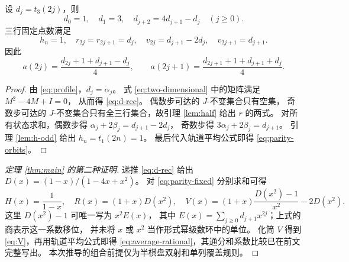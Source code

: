 \begin{proposition}\label{prop:parity}
设 $d_j=t_3(2j)$，则
\begin{equation}\label{eq:d-rec}
 d_0=1,\quad d_1=3,\quad d_{j+2}=4d_{j+1}-d_j\quad(j\ge0).
\end{equation}
三行固定点数满足
\begin{equation}\label{eq:parity-fixed}
 h_n=1,\quad r_{2j}=r_{2j+1}=d_j,\quad
 v_{2j}=d_{j+1}-2d_j,\quad v_{2j+1}=d_{j+1}.
\end{equation}
因此
\begin{equation}\label{eq:parity-orbits}
 a(2j)=\frac{d_{2j}+1+d_{j+1}-d_j}{4},\qquad
 a(2j+1)=\frac{d_{2j+1}+1+d_{j+1}+d_j}{4}.
\end{equation}
\end{proposition}
\begin{proof}
由 \eqref{eq:profile}，$d_j=\alpha_j$。
式 \eqref{eq:two-dimensional} 中的矩阵满足 $M^2-4M+I=0$，
从而得 \eqref{eq:d-rec}。
偶数步可达的 $J$-不变集合只有空集，
奇数步可达的 $J$-不变集合只有全三行集合，故引理 \ref{lem:half} 给出 $r$ 的两式。
对所有状态求和，偶数步得
$\alpha_j+2\beta_j=d_{j+1}-2d_j$，
奇数步得 $3\alpha_j+2\beta_j=d_{j+1}$。
引理 \ref{lem:h-odd} 给出 $h_n=t_1(2n)=1$。
最后代入轨道平均公式即得 \eqref{eq:parity-orbits}。
\end{proof}

\begin{proof}[定理 \ref{thm:main} 的第二种证明]
递推 \eqref{eq:d-rec} 给出 $D(x)=(1-x)/(1-4x+x^2)$。
对 \eqref{eq:parity-fixed} 分别求和可得
\[
 H(x)=\frac1{1-x},\quad R(x)=(1+x)D(x^2),\quad
 V(x)=(1+x)\frac{D(x^2)-1}{x^2}-2D(x^2).
\]
这里 $D(x^2)-1$ 可唯一写为 $x^2 E(x)$，
其中 $E(x)=\sum_{j\ge0}d_{j+1}x^{2j}$；上式的商表示这一系数移位，
并未将 $x$ 或 $x^2$ 当作形式幂级数环中的单位。
化简 $V$ 得到 \eqref{eq:V}，再用轨道平均公式即得
\eqref{eq:average-rational}，其通分和系数比较已在前文完整写出。
本次推导的组合前提仅为半棋盘双射和单列覆盖规则。
\end{proof}
